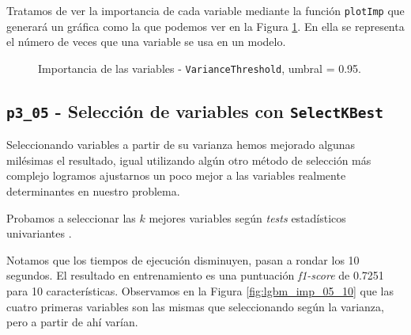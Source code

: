 \documentclass[a4paper, 20pt]{article}
\begin{document}
Tratamos de ver la importancia de cada variable mediante la función \texttt{plotImp} que generará un gráfica como la que podemos ver en la Figura \ref{fig:lgbm_imp_04}. En ella se representa el número de veces que una variable se usa en un modelo.
\begin{figure}[H]
    \caption{Importancia de las variables - \texttt{VarianceThreshold}, umbral = 0.95.}
    \label{fig:lgbm_imp_04}
\end{figure}

\subsection{\texttt{p3\_05} - Selección de variables con \texttt{SelectKBest}}
Seleccionando variables a partir de su varianza hemos mejorado algunas milésimas el resultado, igual utilizando algún otro método de selección más complejo logramos ajustarnos un poco mejor a las variables realmente determinantes en nuestro problema.

Probamos a seleccionar las $k$ mejores variables según \textit{tests} estadísticos univariantes \cite{noauthor_sklearn.feature_selection.selectkbest_nodate}.

Notamos que los tiempos de ejecución disminuyen, pasan a rondar los 10 segundos. El resultado en entrenamiento es una puntuación \textit{f1-score} de 0.7251 para 10 características. Observamos en la Figura \ref{fig:lgbm_imp_05_10} que las cuatro primeras variables son las mismas que seleccionando según la varianza, pero a partir de ahí varían.
\end{document}
